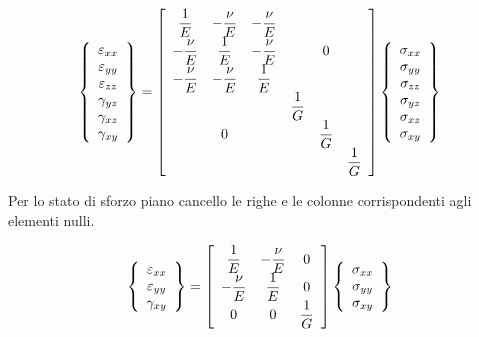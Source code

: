  \begin{equation*}
\left\{
\begin{array}{c}
\varepsilon_{xx} \\
\varepsilon_{yy} \\
\varepsilon_{zz} \\
\gamma_{yz} \\
\gamma_{xz} \\
\gamma_{xy}
\end{array}
\right\}
=
\left[
\begin{array}{cccccc}
\displaystyle \frac{1}{E} & \displaystyle -\frac{\nu}{E} & \displaystyle -\frac{\nu}{E} & & & \\
\displaystyle -\frac{\nu}{E} & \displaystyle \frac{1}{E} & \displaystyle -\frac{\nu}{E} & & \large{0} & \\
\displaystyle -\frac{\nu}{E} & \displaystyle -\frac{\nu}{E} & \displaystyle \frac{1}{E} & & & \\
& & & \displaystyle \frac{1}{G} & & \\
& \large{0} & & & \displaystyle \frac{1}{G} & \\
& & & & & \displaystyle \frac{1}{G}
\end{array}
\right]
\left\{
\begin{array}{c}
\sigma_{xx} \\
\sigma_{yy} \\
\sigma_{zz} \\
\sigma_{yz} \\
\sigma_{xz} \\
\sigma_{xy}
\end{array}
\right\}
\end{equation*}

Per lo stato di sforzo piano cancello le righe e le colonne corrispondenti agli elementi nulli.

\begin{equation*}
\left\{
\begin{array}{c}
\varepsilon_{xx} \\
\varepsilon_{yy} \\
\gamma_{xy}
\end{array}
\right\}
=
\left[
\begin{array}{ccc}
\displaystyle \frac{1}{E} & \displaystyle -\frac{\nu}{E} & \large{0}\\
\displaystyle -\frac{\nu}{E} & \displaystyle \frac{1}{E} & \large{0} \\
\large{0}& \large{0} & \displaystyle \frac{1}{G}
\end{array}
\right]
\left\{
\begin{array}{c}
\sigma_{xx} \\
\sigma_{yy} \\
\sigma_{xy}
\end{array}
\right\}
\end{equation*}

